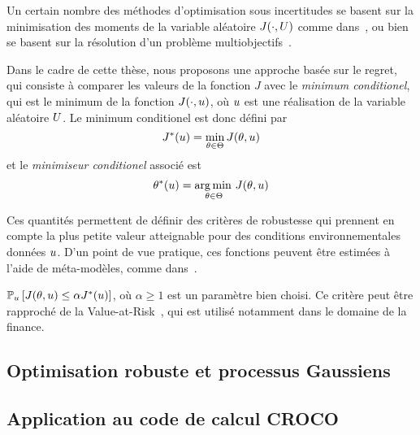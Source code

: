 \documentclass[../../Main_ManuscritThese.tex]{subfiles}
\begin{document}
Un certain nombre des méthodes d'optimisation sous incertitudes se
basent sur la minimisation des moments de la variable aléatoire
$J(\mathbf{\cdot}, U)$ comme
dans~\cite{lehman_designing_2004,janusevskis_simultaneous_2010}, ou
bien se basent sur la résolution d'un problème
multiobjectifs~\cite{baudoui_optimisation_2012,ribaud_krigeage_2018}.

Dans le cadre de cette thèse, nous proposons une approche basée sur le
regret, qui consiste à comparer les valeurs de la fonction $J$ avec le
\emph{minimum conditionel}, qui est le minimum de la fonction
$J(\cdot, u)$, où $u$ est une réalisation de la variable aléatoire
$U$. Le minimum conditionel est donc défini par
\begin{equation}
  \label{eq:Jstar}
  J^*(u) = \min_{\theta\in\Theta} J(\theta,u)
\end{equation}
et le \emph{minimiseur conditionel} associé est
\begin{equation}
  \label{eq:Kstar}
  \theta^*(u) = \operatorname*{arg\,min \,}_{\theta\in \Theta}J(\theta,u)
\end{equation}

\cite{trappler_robust_2020-1}
Ces quantités permettent de définir des critères de robustesse qui
prennent en compte la plus petite valeur atteignable pour des
conditions environnementales données $u$.  D'un point de vue
pratique, ces fonctions peuvent être estimées à l'aide de
méta-modèles, comme dans~\cite{ginsbourger_bayesian_2014}.
 

$\mathbb{P}_{u}\left[J(\theta,u) \leq \alpha J^*(u) \right]$, où
$\alpha \geq 1$ est un paramètre bien choisi. Ce critère peut être
rapproché de la Value-at-Risk~\cite{rockafellar_deviation_2002}, qui
est utilisé notamment dans le domaine de la finance.

\subsection*{Optimisation robuste et processus Gaussiens}
\subsection*{Application au code de calcul CROCO}
\end{document}
